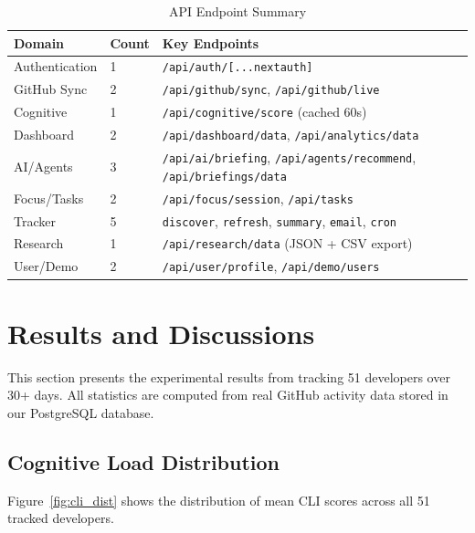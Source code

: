 \documentclass[12pt]{article}
\begin{document}
\begin{table}[H]
\centering
\caption{API Endpoint Summary}
\label{tab:api}
\begin{tabular}{@{}llp{6.5cm}@{}}
\toprule
\textbf{Domain} & \textbf{Count} & \textbf{Key Endpoints} \\
\midrule
Authentication & 1 & \texttt{/api/auth/[...nextauth]} \\
GitHub Sync    & 2 & \texttt{/api/github/sync}, \texttt{/api/github/live} \\
Cognitive      & 1 & \texttt{/api/cognitive/score} (cached 60s) \\
Dashboard      & 2 & \texttt{/api/dashboard/data}, \texttt{/api/analytics/data} \\
AI/Agents      & 3 & \texttt{/api/ai/briefing}, \texttt{/api/agents/recommend}, \texttt{/api/briefings/data} \\
Focus/Tasks    & 2 & \texttt{/api/focus/session}, \texttt{/api/tasks} \\
Tracker        & 5 & \texttt{discover}, \texttt{refresh}, \texttt{summary}, \texttt{email}, \texttt{cron} \\
Research       & 1 & \texttt{/api/research/data} (JSON + CSV export) \\
User/Demo      & 2 & \texttt{/api/user/profile}, \texttt{/api/demo/users} \\
\bottomrule
\end{tabular}
\end{table}

\newpage

\section{Results and Discussions}

This section presents the experimental results from tracking 51 developers over 30+ days. All statistics are computed from real GitHub activity data stored in our PostgreSQL database.

\subsection{Cognitive Load Distribution}

Figure~\ref{fig:cli_dist} shows the distribution of mean CLI scores across all 51 tracked developers.
\end{document}
